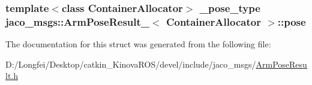 \subsubsection[{\texorpdfstring{pose}{pose}}]{\setlength{\rightskip}{0pt plus 5cm}template$<$class Container\+Allocator$>$ {\bf \+\_\+pose\+\_\+type} {\bf jaco\+\_\+msgs\+::\+Arm\+Pose\+Result\+\_\+}$<$ Container\+Allocator $>$\+::pose}\hypertarget{structjaco__msgs_1_1ArmPoseResult___a35fabbce17a2d3c3c0e9bcd97985053b}{}\label{structjaco__msgs_1_1ArmPoseResult___a35fabbce17a2d3c3c0e9bcd97985053b}


The documentation for this struct was generated from the following file\+:\begin{DoxyCompactItemize}
\item 
D\+:/\+Longfei/\+Desktop/catkin\+\_\+\+Kinova\+R\+O\+S/devel/include/jaco\+\_\+msgs/\hyperlink{ArmPoseResult_8h}{Arm\+Pose\+Result.\+h}\end{DoxyCompactItemize}
